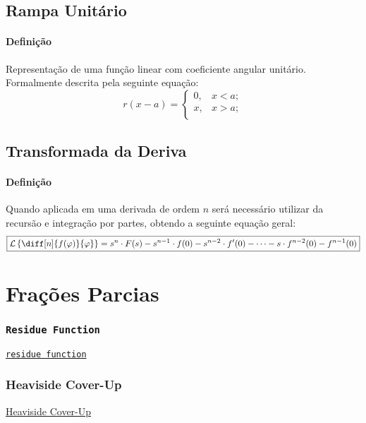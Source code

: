 \documentclass{article}
\begin{document}
\subsection{Rampa Unitário}
    \paragraph{Definição}Representação de uma função linear com coeficiente angular unitário. Formalmente descrita pela seguinte equação:
    \begin{equation}
        \boxed{
            r(x - a) = 
            \begin{cases}
                0, & x < a;\\
                x, & x > a;\\
            \end{cases}
        }
    \end{equation}

\subsection{Transformada da Deriva}
    \paragraph{Definição}Quando aplicada em uma derivada de ordem $n$ será necessário utilizar da recursão e integração por partes, obtendo a seguinte equação geral:
    \begin{equation}
        \boxed{
            \mathcal{L}\left\{\diff[n]{f(\varphi)}{\varphi}\right\} = 
            s^{n}\cdot F(s) - 
            s^{n-1} \cdot f(0) - 
            s^{n-2} \cdot f'(0) - \dots - 
            s \cdot f^{n-2}(0) - 
            f^{n-1}(0)
        }
    \end{equation}


\section{Frações Parcias}
\subsubsection{\texttt{Residue Function}}
\href{https://www.mathworks.com/help/matlab/ref/residue.html}{\texttt{residue function}}

\subsubsection{Heaviside Cover-Up}
\href{https://en.wikipedia.org/wiki/Heaviside_cover-up_method}{Heaviside Cover-Up}
\end{document}
